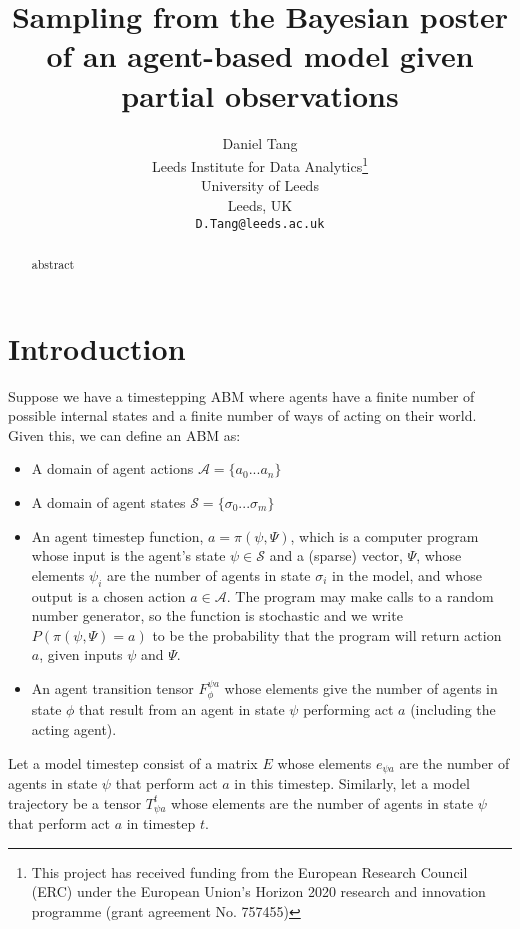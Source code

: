 \documentclass{article}
\title{Sampling from the Bayesian poster of an agent-based model given partial observations}
\author{
  Daniel Tang\\
  Leeds Institute for Data Analytics\thanks{This project has received funding from the European Research Council (ERC) under the European Union’s Horizon 2020 research and innovation programme (grant agreement No. 757455)}\\
  University of Leeds\\
  Leeds, UK\\
  \texttt{D.Tang@leeds.ac.uk} \\
}
\begin{document}
\maketitle

\begin{abstract}
abstract
\end{abstract}


\section{Introduction}


Suppose we have a timestepping ABM where agents have a finite number of possible internal states and a finite number of ways of acting on their world. Given this, we can define an ABM as:
\begin{itemize}
\item A domain of agent actions $\mathcal{A} =\{ a_0 ... a_n \}$

\item A domain of agent states $\mathcal{S} = \{\sigma_0 ... \sigma_m\}$

\item An agent timestep function, $a = \pi(\psi,\Psi)$, which is a computer program whose input is the agent's state $\psi \in \mathcal{S}$ and a (sparse) vector, $\Psi$, whose elements $\psi_i$ are the number of agents in state $\sigma_i$ in the model, and whose output is a chosen action $a \in \mathcal{A}$. The program may make calls to a random number generator, so the function is stochastic and we write $P(\pi(\psi,\Psi)=a)$ to be the probability that the program will return action $a$, given inputs $\psi$ and $\Psi$.

\item An agent transition tensor $F_\phi^{\psi a}$ whose elements give the number of agents in state $\phi$ that result from an agent in state $\psi$ performing act $a$ (including the acting agent).
\end{itemize}

Let a model timestep consist of a matrix $E$ whose elements $e_{\psi a}$ are the number of agents in state $\psi$ that perform act $a$ in this timestep. Similarly, let a model trajectory be a tensor $T^t_{\psi a}$ whose elements are the number of agents in state $\psi$ that perform act $a$ in timestep $t$.
\end{document}
